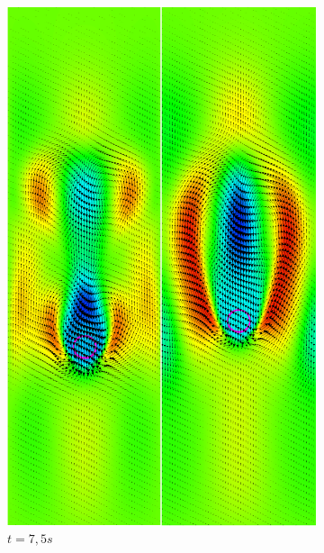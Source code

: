 \begin{figure}[H]
\begin{subfigure}[ht!]{0.3\textwidth}
		\includegraphics[width=1\textwidth]{compare_CL/t=7,5s.png}
		\caption{$t=7,5s$}
	\end{subfigure}
	\begin{subfigure}[ht!]{0.3\textwidth}
		\centering

\end{subfigure}
\end{figure}
